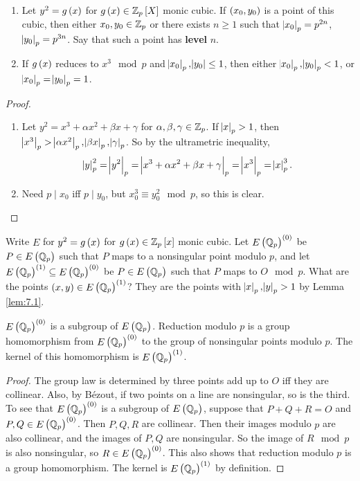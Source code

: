 \begin{lemma}
\label{lem:7.1}
\hfill
\begin{enumerate}
\item Let $ y^2 = g\br{x} $ for $ g\br{x} \in \Z_p\sbr{X} $ monic cubic. If $ \br{x_0, y_0} $ is a point of this cubic, then either $ x_0, y_0 \in \mathbb{Z}_p $ or there exists $ n \ge 1 $ such that $ \abs{x_0}_p = p^{2n} $, $ \abs{y_0}_p = p^{3n} $. Say that such a point has \textbf{level} $ n $.
\item If $ g\br{x} $ reduces to $ x^3 \mod p $ and $ \abs{x_0}_p, \abs{y_0} \le 1 $, then either $ \abs{x_0}_p, \abs{y_0}_p < 1 $, or $ \abs{x_0}_p = \abs{y_0}_p = 1 $.
\end{enumerate}
\end{lemma}

\begin{proof}
\hfill
\begin{enumerate}
\item Let $ y^2 = x^3 + \alpha x^2 + \beta x + \gamma $ for $ \alpha, \beta, \gamma \in \mathbb{Z}_p $. If $ \abs{x}_p > 1 $, then $ \abs{x^3}_p > \abs{\alpha x^2}_p, \abs{\beta x}_p, \abs{\gamma}_p $. So by the ultrametric inequality,
$$ \abs{y}_p^2 = \abs{y^2}_p = \abs{x^3 + \alpha x^2 + \beta x + \gamma}_p = \abs{x^3}_p = \abs{x}_p^3. $$
\item Need $ p \mid x_0 $ iff $ p \mid y_0 $, but $ x_0^3 \equiv y_0^2 \mod p $, so this is clear.
\end{enumerate}
\end{proof}

Write $ E $ for $ y^2 = g\br{x} $ for $ g\br{x} \in \Z_p\sbr{x} $ monic cubic. Let $ E\br{\Q_p}^{\br{0}} $ be $ P \in E\br{\Q_p} $ such that $ P $ maps to a nonsingular point modulo $ p $, and let $ E\br{\Q_p}^{\br{1}} \subseteq E\br{\Q_p}^{\br{0}} $ be $ P \in E\br{\Q_p} $ such that $ P $ maps to $ O \mod p $. What are the points $ \br{x, y} \in E\br{\Q_p}^{\br{1}} $? They are the points with $ \abs{x}_p, \abs{y}_p > 1 $ by Lemma \ref{lem:7.1}.

\begin{lemma}
\label{lem:7.2}
$ E\br{\Q_p}^{\br{0}} $ is a subgroup of $ E\br{\Q_p} $. Reduction modulo $ p $ is a group homomorphism from $ E\br{\Q_p}^{\br{0}} $ to the group of nonsingular points modulo $ p $. The kernel of this homomorphism is $ E\br{\Q_p}^{\br{1}} $.
\end{lemma}

\begin{proof}
The group law is determined by three points add up to $ O $ iff they are collinear. Also, by Bézout, if two points on a line are nonsingular, so is the third. To see that $ E\br{\Q_p}^{\br{0}} $ is a subgroup of $ E\br{\Q_p} $, suppose that $ P + Q + R = O $ and $ P, Q \in E\br{\Q_p}^{\br{0}} $. Then $ P, Q, R $ are collinear. Then their images modulo $ p $ are also collinear, and the images of $ P, Q $ are nonsingular. So the image of $ R \mod p $ is also nonsingular, so $ R \in E\br{\Q_p}^{\br{0}} $. This also shows that reduction modulo $ p $ is a group homomorphism. The kernel is $ E\br{\Q_p}^{\br{1}} $ by definition.
\end{proof}

